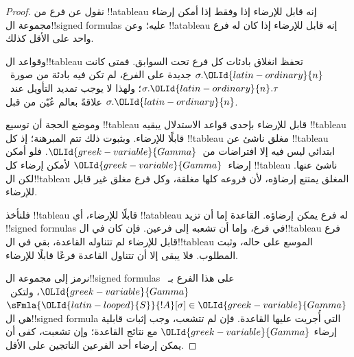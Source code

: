 \documentclass[../../../include/open-logic-section]{subfiles}
\begin{document}
\begin{proof}
نقول عن فرع من !!a{tableau} إنه قابل للإرضاء إذا وفقط إذا أمكن إرضاء
مجموعة ال!!{signed formula}s عليه؛ وعن !!a{tableau} إنه قابل للإرضاء
إذا كان له فرع واحد على الأقل كذلك.

وقواعد ال!!{tableau} تحفظ انغلاق بادئات كل فرع تحت السوابق. فمتى كانت
$\sigma.{\OLId{latin-ordinary}{n}}$ جديدة على الفرع، لم تكن فيه بادئة من صورة~$\sigma.{\OLId{latin-ordinary}{n}}.\tau$؛
ولهذا لا يوجب تمديد التأويل عند~$\sigma.{\OLId{latin-ordinary}{n}}$ علاقةً بعالم عُيّن من قبل.

وموضع الحجة أن توسيع !!{tableau} قابل للإرضاء بإحدى قواعد الاستدلال
يبقيه !!{tableau} قابلًا للإرضاء. وبثبوت ذلك تتم المبرهنة؛ إذ كل
!!{tableau} مغلق ناشئ عن !!{tableau} ابتدائي ليس فيه إلا افتراضات
من~${\OLId{greek-variable}{Gamma}}$. فلو أمكن إرضاء~${\OLId{greek-variable}{Gamma}}$ لأمكن إرضاء كل !!{tableau}
ناشئ عنها. لكن ال!!{tableau} المغلق يمتنع إرضاؤه، لأن فروعه كلها
مغلقة، وكل فرع مغلق غير قابل للإرضاء.

فلنأخذ !!{tableau} قابلًا للإرضاء، أي !!a{tableau} له فرع يمكن إرضاؤه.
القاعدة إما أن تزيد !!{signed formula}s في فرع، وإما أن تشعبه إلى
فرعين. فإن كان في ال!!{tableau} فرع قابل للإرضاء لم تتناوله القاعدة،
بقي في ال!!{tableau} الموسع على حاله، وثبت المطلوب. فلا يبقى إلا أن
تتناول القاعدة فرعًا قابلًا للإرضاء.

نرمز إلى مجموعة ال!!{signed formula}s على هذا الفرع بـ~${\OLId{greek-variable}{Gamma}}$،
ولتكن~$\sFmla{{\OLId{latin-looped}{S}}}{!A}[\sigma] \in {\OLId{greek-variable}{Gamma}}$ هي ال!!{signed formula}
التي أُجريت عليها القاعدة. فإن لم تتشعب، وجب إثبات قابلية إرضاء
${\OLId{greek-variable}{Gamma}}$ مع نتائج القاعدة؛ وإن تشعبت، كفى أن يمكن إرضاء أحد الفرعين
الناتجين على الأقل.


\end{proof}
\end{document}
